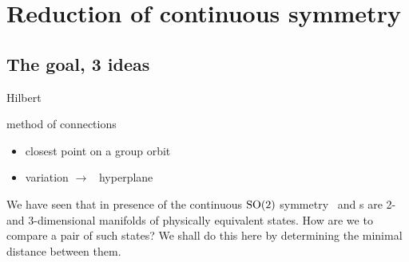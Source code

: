 

\section{Reduction of continuous symmetry}
\label{s:slice}
\subsection{The goal, 3 ideas}

 Hilbert

 method of connections

 \mslices

    \begin{itemize}
      \item closest point on a group orbit
      \item variation $\to$ \slice\ hyperplane
    \end{itemize}

We have seen that in presence of the continuous $\textrm{SO}(2)$ symmetry
\reqva\ and \rpo s are 2- and 3-dimensional manifolds of physically
equivalent states. How are we to compare a pair of such states? We shall
do this here by determining the minimal distance between them.

